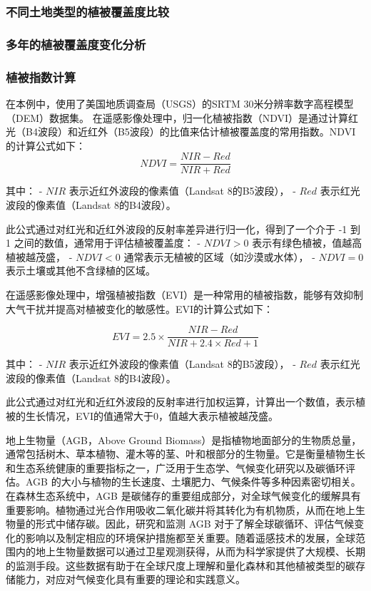 \documentclass{article}
\begin{document}
		\subsubsection{不同土地类型的植被覆盖度比较}

		
		
		\subsubsection{多年的植被覆盖度变化分析}
		
		
		
		
		
		
		
		\subsubsection{植被指数计算}
		
				
		在本例中，使用了美国地质调查局（USGS）的SRTM 30米分辨率数字高程模型（DEM）数据集。
		在遥感影像处理中，归一化植被指数（NDVI）是通过计算红光（B4波段）和近红外（B5波段）的比值来估计植被覆盖度的常用指数。NDVI的计算公式如下：
		\[
		NDVI = \frac{NIR - Red}{NIR + Red}
		\]
		
		其中：
		- \( NIR \) 表示近红外波段的像素值（Landsat 8的B5波段），
		- \( Red \) 表示红光波段的像素值（Landsat 8的B4波段）。
		
		此公式通过对红光和近红外波段的反射率差异进行归一化，得到了一个介于 -1 到 1 之间的数值，通常用于评估植被覆盖度：
		- \( NDVI > 0 \) 表示有绿色植被，值越高植被越茂盛，
		- \( NDVI < 0 \) 通常表示无植被的区域（如沙漠或水体），
		- \( NDVI = 0 \) 表示土壤或其他不含绿植的区域。
		
		在遥感影像处理中，增强植被指数（EVI）是一种常用的植被指数，能够有效抑制大气干扰并提高对植被变化的敏感性。EVI的计算公式如下：
		
		\[
		EVI = 2.5 \times \frac{NIR - Red}{NIR + 2.4 \times Red + 1}
		\]
		
		其中：
		- \( NIR \) 表示近红外波段的像素值（Landsat 8的B5波段），
		- \( Red \) 表示红光波段的像素值（Landsat 8的B4波段）。
		
		此公式通过对红光和近红外波段的反射率进行加权运算，计算出一个数值，表示植被的生长情况，EVI的值通常大于0，值越大表示植被越茂盛。
		\par
		地上生物量（AGB，Above Ground Biomass）是指植物地面部分的生物质总量，通常包括树木、草本植物、灌木等的茎、叶和根部分的生物量。它是衡量植物生长和生态系统健康的重要指标之一，广泛用于生态学、气候变化研究以及碳循环评估。AGB 的大小与植物的生长速度、土壤肥力、气候条件等多种因素密切相关。在森林生态系统中，AGB 是碳储存的重要组成部分，对全球气候变化的缓解具有重要影响。植物通过光合作用吸收二氧化碳并将其转化为有机物质，从而在地上生物量的形式中储存碳。因此，研究和监测 AGB 对于了解全球碳循环、评估气候变化的影响以及制定相应的环境保护措施都至关重要。随着遥感技术的发展，全球范围内的地上生物量数据可以通过卫星观测获得，从而为科学家提供了大规模、长期的监测手段。这些数据有助于在全球尺度上理解和量化森林和其他植被类型的碳存储能力，对应对气候变化具有重要的理论和实践意义。
		
\end{document}
